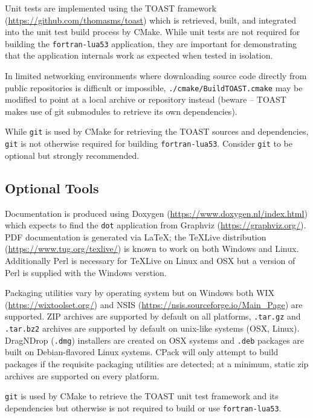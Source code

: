 Unit tests are implemented using the TOAST framework
(\url{https://github.com/thomasms/toast}) which is retrieved, built, and
integrated into the unit test build process by CMake. While unit tests
are not required for building the \texttt{fortran-lua53} application, they are
important for demonstrating that the application internals work as
expected when tested in isolation.

In limited networking environments where downloading source code
directly from public repositories is difficult or impossible,
\texttt{./cmake/BuildTOAST.cmake} may be modified to point at a local
archive or repository instead (beware -- TOAST
makes use of git submodules to retrieve its own dependencies).

While \texttt{git} is used by CMake for retrieving the TOAST sources and
dependencies, \texttt{git} is not otherwise required for building
\texttt{fortran-lua53}. Consider \texttt{git} to be optional but strongly
recommended.

\subsection{Optional Tools}

Documentation is produced using Doxygen
(\url{https://www.doxygen.nl/index.html}) which expects to find the
\texttt{dot} application from Graphviz (\url{https://graphviz.org/}).
PDF documentation is generated via \LaTeX; the TeXLive distribution
(\url{https://www.tug.org/texlive/}) is known to work on both Windows
and Linux. Additionally Perl is necessary for TeXLive on Linux and OSX
but a version of Perl is supplied with the Windows verstion.

Packaging utilities vary by operating system but on Windows both WIX
(\url{https://wixtoolset.org/}) and NSIS
(\url{https://nsis.sourceforge.io/Main_Page}) are supported. ZIP
archives are supported by default on all platforms, \texttt{.tar.gz}
and \texttt{.tar.bz2} archives are supported by default
on unix-like systems (OSX, Linux). DragNDrop (\texttt{.dmg}) installers
are created on OSX systems and \texttt{.deb} packages are built on
Debian-flavored Linux systems. CPack will only attempt to build
packages if the requisite packaging utilities are detected; at a
minimum, static zip archives are supported on every platform.

\texttt{git} is used by CMake to retrieve the TOAST unit test framework
and its dependencies but otherwise is not required to build or use
\texttt{fortran-lua53}.

